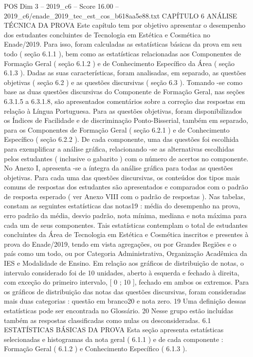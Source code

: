 \begin{textsample}{POS Dim 3 – 2019\_c6 – Score 16.00 – 2019\_c6/enade\_2019\_tec\_est\_cos\_b618aa5e88.txt}  \label{ex:f3_pos_011}
CAPÍTULO 6 ANÁLISE TÉCNICA DA PROVA Este capítulo tem por objetivo apresentar o desempenho dos estudantes concluintes de Tecnologia em Estética e Cosmética no Enade/2019.
Para isso, foram calculadas as estatísticas básicas da prova em seu todo ( seção 6.1.1 ), bem como as estatísticas relacionadas aos Componentes de Formação Geral ( seção 6.1.2 ) e de Conhecimento Específico da Área ( seção 6.1.3 ).
Dadas as suas características, foram analisadas, em separado, as questões objetivas ( seção 6.2 ) e as questões discursivas ( seção 6.3 ).
Tomando -se como base as duas questões discursivas do Componente de Formação Geral, nas seções 6.3.1.5 a 6.3.1.8, são apresentados comentários sobre a correção das respostas em relação à Língua Portuguesa.
Para as questões objetivas, foram disponibilizados os Índices de Facilidade e de discriminação Ponto-Bisserial, também em separado, para os Componentes de Formação Geral ( seção 6.2.1 ) e de Conhecimento Específico ( seção 6.2.2 ).
De cada componente, uma das questões foi escolhida para exemplificar a análise gráfica, relacionando -se as alternativas escolhidas pelos estudantes ( inclusive o gabarito ) com o número de acertos no componente.
No Anexo I, apresenta -se a íntegra da análise gráfica para todas as questões objetivas.
Para cada uma das questões discursivas, os conteúdos dos tipos mais comuns de respostas dos estudantes são apresentados e comparados com o padrão de resposta esperado ( ver Anexo VIII com o padrão de respostas ).
Nas tabelas, constam as seguintes estatísticas das notas19 : média do desempenho na prova, erro padrão da média, desvio padrão, nota mínima, mediana e nota máxima para cada um de seus componentes.
Tais estatísticas contemplam o total de estudantes concluintes da Área de Tecnologia em Estética e Cosmética inscritos e presentes à prova do Enade/2019, tendo em vista agregações, ou por Grandes Regiões e o país como um todo, ou por Categoria Administrativa, Organização Acadêmica da IES e Modalidade de Ensino.
Em relação aos gráficos de distribuição de notas, o intervalo considerado foi de 10 unidades, aberto à esquerda e fechado à direita, com exceção do primeiro intervalo, [ 0 ; 10 ], fechado em ambos os extremos.
Para os gráficos de distribuição das notas das questões discursivas, foram consideradas mais duas categorias : questão em branco20 e nota zero. 19 Uma definição dessas estatísticas pode ser encontrada no Glossário. 20 Nesse grupo estão incluídas também as respostas classificadas como nulas ou desconsideradas. 6.1 ESTATÍSTICAS BÁSICAS DA PROVA Esta seção apresenta estatísticas selecionadas e histogramas da nota geral ( 6.1.1 ) e de cada componente : Formação Geral ( 6.1.2 ) e Conhecimento Específico ( 6.1.3 ).

\end{textsample}
